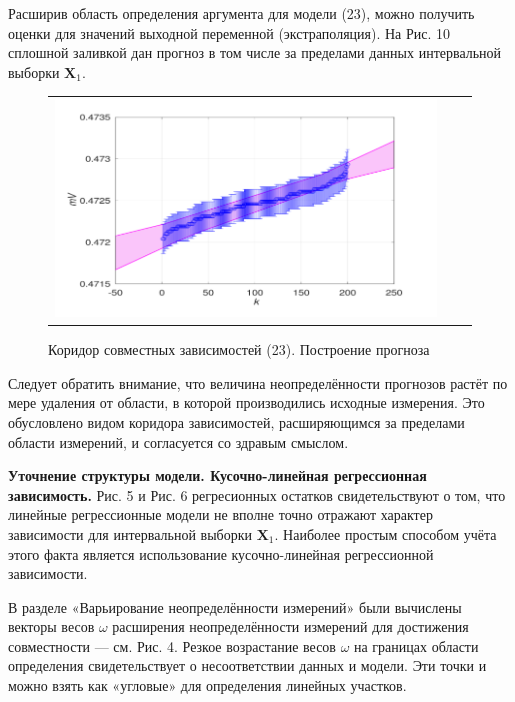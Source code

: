 \documentclass[a4paper,14pt]{article}
\begin{document}
	Расширив область определения аргумента для модели (23), можно
	получить оценки для значений выходной переменной (экстраполяция).
	На Рис. 10 сплошной заливкой дан прогноз в том числе за пределами
	данных интервальной выборки $\textbf{X}_1$.
	
	\begin{figure}[H]
		\begin{center}
			\begin{tabular}{ccc}
				\includegraphics[scale=0.8]{../image/problem10.png}
			\end{tabular}
		\end{center}
		\caption{Коридор совместных зависимостей (23). Построение прогноза} 
	\end{figure}
	
	Следует обратить внимание, что величина неопределённости прогнозов растёт по мере удаления от области, в которой производились исходные измерения. Это обусловлено видом коридора зависимостей, расширяющимся за пределами области измерений, и согласуется со
	здравым смыслом.
	
	\textbf{Уточнение структуры модели. Кусочно-линейная регрессионная зависимость.} Рис. 5 и Рис. 6 регресионных остатков свидетельствуют о том, что линейные регрессионные модели не вполне точно отражают характер зависимости для интервальной выборки $\textbf{X}_1$.
	Наиболее простым способом учёта этого факта является использование кусочно-линейная регрессионной зависимости.
	
	В разделе «Варьирование неопределённости измерений» были вычислены векторы весов $\omega$ расширения неопределённости измерений для достижения совместности — см. Рис. 4. Резкое возрастание весов $\omega$ на границах области определения свидетельствует о несоответствии данных и модели. Эти точки и можно взять как «угловые» для определения линейных участков.
	
\end{document}
